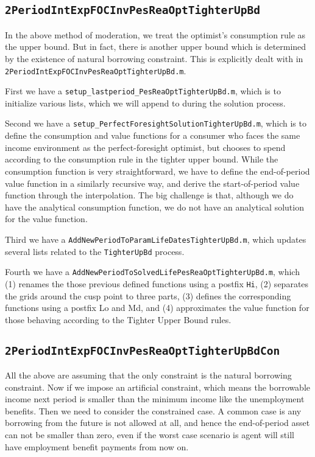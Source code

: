 \documentclass[titlepage,abstract]{\econtex}
\begin{document}
\subsection{\texttt{2PeriodIntExpFOCInvPesReaOptTighterUpBd}}
In the above method of moderation, we treat the optimist's consumption rule as the upper bound. But in fact, there is another upper bound which is determined by the existence of natural borrowing constraint. This is explicitly dealt with in \texttt{2PeriodIntExpFOCInvPesReaOptTighterUpBd.m}.

First we have a \texttt{setup\_lastperiod\_PesReaOptTighterUpBd.m}, which is to initialize various lists, which we will append to during the solution process.

Second we have a \texttt{setup\_PerfectForesightSolutionTighterUpBd.m}, which is to define the consumption and value functions for a consumer who faces the same income environment as the perfect-foresight optimist, but chooses to spend according to the consumption rule in the tighter upper bound. While the consumption function is very straightforward, we have to define the end-of-period value function in a similarly recursive way, and derive the start-of-period value function through the interpolation. The big challenge is that, although we do have the analytical consumption function, we do not have an analytical solution for the value function.

Third we have a \texttt{AddNewPeriodToParamLifeDatesTighterUpBd.m}, which updates several lists related to the \texttt{TighterUpBd} process.

Fourth we have a \texttt{AddNewPeriodToSolvedLifePesReaOptTighterUpBd.m}, which (1) renames the those previous defined
functions using a postfix \texttt{Hi}, (2) separates the grids around the cusp point to three parts, (3) defines the corresponding functions using a postfix {Lo} and {Md}, and (4) approximates the value function for those behaving according to the Tighter Upper Bound rules.

\subsection{\texttt{2PeriodIntExpFOCInvPesReaOptTighterUpBdCon}}
All the above are assuming that the only constraint is the natural borrowing constraint. Now if we impose an artificial constraint, which means the borrowable income next period is smaller than the minimum income like the unemployment benefits. Then we need to consider the constrained case. A common case is any borrowing from the future is not allowed at all, and hence the end-of-period asset can not be smaller than zero, even if the worst case scenario is agent will still have employment benefit payments from now on.
\end{document}

